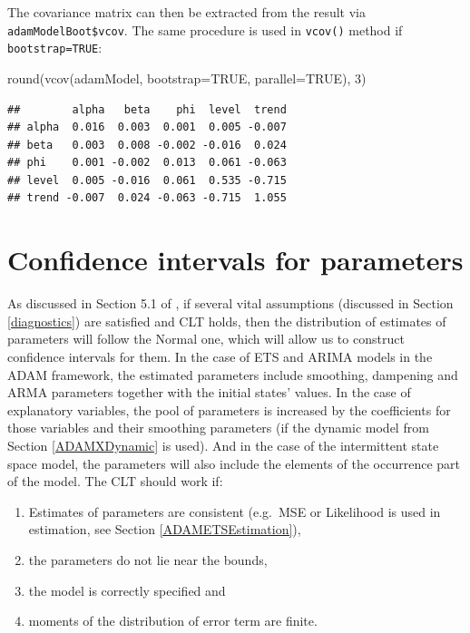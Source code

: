 \documentclass[
]{book}
\newenvironment{Shaded}{\begin{snugshade}}{\end{snugshade}}
\newcommand{\AttributeTok}[1]{\textcolor[rgb]{0.77,0.63,0.00}{#1}}
\newcommand{\ConstantTok}[1]{\textcolor[rgb]{0.00,0.00,0.00}{#1}}
\newcommand{\DecValTok}[1]{\textcolor[rgb]{0.00,0.00,0.81}{#1}}
\newcommand{\FunctionTok}[1]{\textcolor[rgb]{0.00,0.00,0.00}{#1}}
\newcommand{\NormalTok}[1]{#1}
\providecommand{\tightlist}{%
  \setlength{\itemsep}{0pt}\setlength{\parskip}{0pt}}
\theoremstyle{definition}
\theoremstyle{definition}
\theoremstyle{definition}
\theoremstyle{definition}
\theoremstyle{remark}
\begin{document}
The covariance matrix can then be extracted from the result via \texttt{adamModelBoot\$vcov}. The same procedure is used in \texttt{vcov()} method if \texttt{bootstrap=TRUE}:

\begin{Shaded}
\begin{Highlighting}[]
\FunctionTok{round}\NormalTok{(}\FunctionTok{vcov}\NormalTok{(adamModel, }\AttributeTok{bootstrap=}\ConstantTok{TRUE}\NormalTok{, }\AttributeTok{parallel=}\ConstantTok{TRUE}\NormalTok{), }\DecValTok{3}\NormalTok{)}
\end{Highlighting}
\end{Shaded}

\begin{verbatim}
##        alpha   beta    phi  level  trend
## alpha  0.016  0.003  0.001  0.005 -0.007
## beta   0.003  0.008 -0.002 -0.016  0.024
## phi    0.001 -0.002  0.013  0.061 -0.063
## level  0.005 -0.016  0.061  0.535 -0.715
## trend -0.007  0.024 -0.063 -0.715  1.055
\end{verbatim}

\hypertarget{confidence-intervals-for-parameters}{%
\section{Confidence intervals for parameters}\label{confidence-intervals-for-parameters}}

As discussed in Section 5.1 of \citet{SvetunkovSBA}, if several vital assumptions (discussed in Section \ref{diagnostics}) are satisfied and CLT holds, then the distribution of estimates of parameters will follow the Normal one, which will allow us to construct confidence intervals for them. In the case of ETS and ARIMA models in the ADAM framework, the estimated parameters include smoothing, dampening and ARMA parameters together with the initial states' values. In the case of explanatory variables, the pool of parameters is increased by the coefficients for those variables and their smoothing parameters (if the dynamic model from Section \ref{ADAMXDynamic} is used). And in the case of the intermittent state space model, the parameters will also include the elements of the occurrence part of the model. The CLT should work if:

\begin{enumerate}
\def\labelenumi{\arabic{enumi}.}
\tightlist
\item
  Estimates of parameters are consistent (e.g.~MSE or Likelihood is used in estimation, see Section \ref{ADAMETSEstimation}),
\item
  the parameters do not lie near the bounds,
\item
  the model is correctly specified and
\item
  moments of the distribution of error term are finite.
\end{enumerate}
\end{document}
